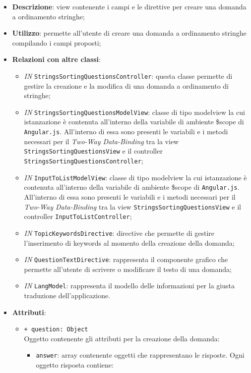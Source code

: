 \begin{itemize}
	\item \textbf{Descrizione}: view contenente i campi e le direttive per creare una domanda a ordinamento stringhe;
	\item \textbf{Utilizzo}: permette all'utente di creare una domanda a ordinamento stringhe compilando i campi proposti;
	\item \textbf{Relazioni con altre classi}:
		\begin{itemize}
			\item \textit{IN} \texttt{StringsSortingQuestionsController}: questa classe permette di gestire la creazione e la modifica di una domanda a ordinamento di stringhe;
			\item \textit{IN} \texttt{StringsSortingQuestionsModelView}: classe di tipo modelview la cui istanzazione è contenuta all'interno della variabile di ambiente \$scope di \texttt{Angular.js}. All'interno di essa sono presenti le variabili e i metodi necessari per il \textit{Two-Way Data-Binding} tra la view \texttt{StringsSortingQuestionsView} e il controller \texttt{StringsSortingQuestionsController};
			\item \textit{IN} \texttt{InputToListModelView}: classe di tipo modelview la cui istanzazione è contenuta all'interno della variabile di ambiente \$scope di \texttt{Angular.js}. All'interno di essa sono presenti le variabili e i metodi necessari per il \textit{Two-Way Data-Binding} tra la view \texttt{StringsSortingQuestionsView} e il controller \texttt{InputToListController};
			\item \textit{IN} \texttt{TopicKeywordsDirective}: directive che permette di gestire l'inserimento di keywords al momento della creazione della domanda;
			\item \textit{IN} \texttt{QuestionTextDirective}: rappresenta il componente grafico che permette all'utente di scrivere o modificare il testo di una domanda;
			\item \textit{IN} \texttt{LangModel}: rappresenta il modello delle informazioni per la giusta traduzione dell'applicazione.
		\end{itemize}
	\item \textbf{Attributi}:
	\begin{itemize}
		\item \texttt{+ question: Object} \\ Oggetto contenente gli attributi per la creazione della domanda:
		\begin{itemize}
			\item \texttt{answer}: array contenente oggetti che rappresentano le risposte. Ogni oggetto risposta contiene:

\end{itemize}
\end{itemize}
\end{itemize}
